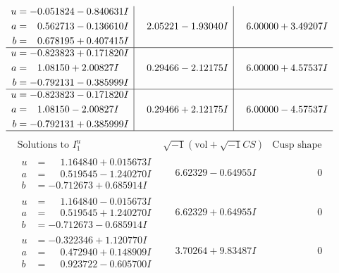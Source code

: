 \documentclass[1p]{elsarticle_modified}
\theoremstyle{definition}
\newcommand{\I}{\sqrt{-1}}
\begin{document}
$$\begin{array}{c|c|c}
\begin{aligned}
u &= -0.051824 - 0.840631 I \\
a &= \phantom{-}0.562713 - 0.136610 I \\
b &= \phantom{-}0.678195 + 0.407415 I\end{aligned}
 & \phantom{-}2.05221 - 1.93040 I & \phantom{-}6.00000 + 3.49207 I \\ \hline\begin{aligned}
u &= -0.823823 + 0.171820 I \\
a &= \phantom{-}1.08150 + 2.00827 I \\
b &= -0.792131 - 0.385999 I\end{aligned}
 & \phantom{-}0.29466 - 2.12175 I & \phantom{-}6.00000 + 4.57537 I \\ \hline\begin{aligned}
u &= -0.823823 - 0.171820 I \\
a &= \phantom{-}1.08150 - 2.00827 I \\
b &= -0.792131 + 0.385999 I\end{aligned}
 & \phantom{-}0.29466 + 2.12175 I & \phantom{-}6.00000 - 4.57537 I\\
 \hline 
 \end{array}$$\newpage$$\begin{array}{c|c|c}  
\text{Solutions to }I^u_{1}& \I (\text{vol} + \sqrt{-1}CS) & \text{Cusp shape}\\
 \hline 
\begin{aligned}
u &= \phantom{-}1.164840 + 0.015673 I \\
a &= \phantom{-}0.519545 - 1.240270 I \\
b &= -0.712673 + 0.685914 I\end{aligned}
 & \phantom{-}6.62329 - 0.64955 I & \phantom{-0.000000 } 0 \\ \hline\begin{aligned}
u &= \phantom{-}1.164840 - 0.015673 I \\
a &= \phantom{-}0.519545 + 1.240270 I \\
b &= -0.712673 - 0.685914 I\end{aligned}
 & \phantom{-}6.62329 + 0.64955 I & \phantom{-0.000000 } 0 \\ \hline\begin{aligned}
u &= -0.322346 + 1.120770 I \\
a &= \phantom{-}0.472940 + 0.148909 I \\
b &= \phantom{-}0.923722 - 0.605700 I\end{aligned}
 & \phantom{-}3.70264 + 9.83487 I & \phantom{-0.000000 } 0 \\ \hline\begin{aligned}

\end{aligned}
\end{array}$$
\end{document}
